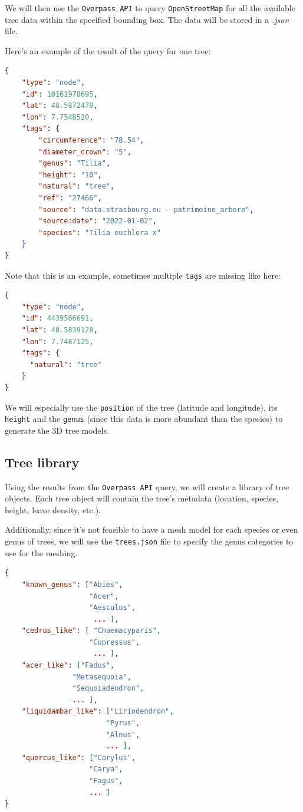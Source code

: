 \documentclass[12pt]{article}
\begin{document}
We will then use the \texttt{Overpass API} to query \texttt{OpenStreetMap}
for all the available tree data within the specified bounding box.
The data will be stored in a \textit{.json} file.

\newpage
Here's an example of the result of the query for one tree:

\begin{lstlisting}[language=json]
{
    "type": "node",
    "id": 10161978695,
    "lat": 48.5872478,
    "lon": 7.7548520,
    "tags": {
        "circumference": "78.54",
        "diameter_crown": "5",
        "genus": "Tilia",
        "height": "10",
        "natural": "tree",
        "ref": "27466",
        "source": "data.strasbourg.eu - patrimoine_arbore",
        "source:date": "2022-01-02",
        "species": "Tilia euchlora x"
    }
}
\end{lstlisting}

Note that this is an example, sometimes multiple \texttt{tags} are missing like here:

\begin{lstlisting}[language=json]
{
    "type": "node",
    "id": 4439566691,
    "lat": 48.5839128,
    "lon": 7.7487125,
    "tags": {
      "natural": "tree"
    }
}
\end{lstlisting}

We will especially use the \texttt{position} of the tree (latitude and longitude),
its \texttt{height} and the \texttt{genus} (since this data is more abundant than the species)
to generate the 3D tree models.

\subsection{Tree library}
Using the results from the \texttt{Overpass API} query, we will create a library
of tree objects. Each tree object will contain the tree's metadata (location, species, height,
leave density, etc.).

Additionally, since it's not feasible to have a mesh model for each species or even genus
 of trees, we will use the \texttt{trees.json} file to specify the genus
 categories to use for the meshing. \\

\newpage

\begin{lstlisting}[language=json]
{
    "known_genus": ["Abies",
                    "Acer",
                    "Aesculus",
                     ... ],
    "cedrus_like": [ "Chaemacyparis",
                    "Cupressus",
                     ... ],
    "acer_like": ["Fadus",
                "Metasequoia",
                "Sequoiadendron",
                ... ],
    "liquidambar_like": ["Liriodendron",
                        "Pyrus",
                        "Alnus",
                        ... ],
    "quercus_like": ["Corylus",
                    "Carya",
                    "Fagus",
                    ... ]
}
\end{lstlisting}
\end{document}
